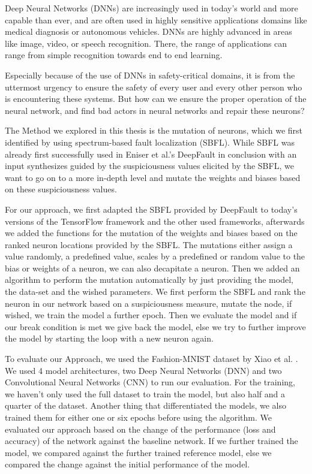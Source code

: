 Deep Neural Networks (DNNs)\cite{lecun_deep_2015} are increasingly used in today's world and more capable than ever, and are often used in highly sensitive applications domains like medical diagnosis\cite{litjens_survey_2017} or autonomous vehicles\cite{bojarski_end_2016}.
DNNs are highly advanced in areas like image\cite{krizhevsky_imagenet_2012, ciresan_multi-column_2012}, video\cite{jiang_exploiting_2018}, or speech recognition\cite{hinton_deep_2012}.
There, the range of applications can range from simple recognition towards end to end learning\cite{bojarski_end_2016}.

Especially because of the use of DNNs in safety-critical domains, it is from the uttermost urgency to ensure the safety of every user and every other person who is encountering these systems.
But how can we ensure the proper operation of the neural network, and find bad actors in neural networks and repair these neurons?

The Method we explored in this thesis is the mutation of neurons, which we first identified by using spectrum-based fault localization (SBFL).
While SBFL was already first successfully used in Eniser et al.'s DeepFault\cite{eniser_deepfault_2019} in conclusion with an input synthesizes guided by the suspiciousness values elicited by the SBFL, we want to go on to a more in-depth level and mutate the weights and biases based on these suspiciousness values.

For our approach, we first adapted the SBFL provided by DeepFault to today's versions of the TensorFlow framework and the other used frameworks, afterwards we added the functions for the mutation of the weights and biases based on the ranked neuron locations provided by the SBFL.
The mutations either assign a value randomly, a predefined value, scales by a predefined or random value to the bias or weights of a neuron, we can also decapitate a neuron.
Then we added an algorithm to perform the mutation automatically by just providing the model, the data-set and the wished parameters.
We first perform the SBFL and rank the neuron in our network based on a suspiciousness measure, mutate the node, if wished, we train the model a further epoch.
Then we evaluate the model and if our break condition is met we give back the model, else we try to further improve the model by starting the loop with a new neuron again.

To evaluate our Approach, we used the Fashion-MNIST dataset by Xiao et al. \cite{xiao_fashion-mnist_2017}.
We used 4 model architectures, two Deep Neural Networks (DNN) and two Convolutional Neural Networks (CNN) to run our evaluation.
For the training, we haven't only used the full dataset to train the model, but also half and a quarter of the dataset.
Another thing that differentiated the models, we also trained them for either one or six epochs before using the algorithm.
We evaluated our approach based on the change of the performance (loss and accuracy) of the network against the baseline network.
If we further trained the model, we compared against the further trained reference model, else we compared the change against the initial performance of the model.

